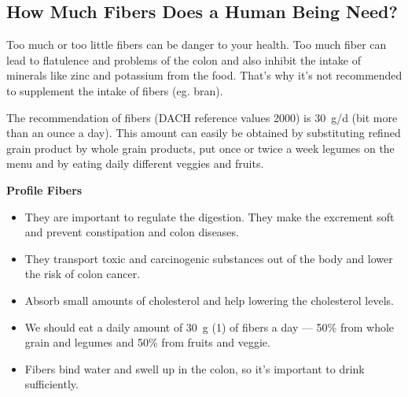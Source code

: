 \documentclass[../main.tex]{subfiles}
\begin{document}


  \subsection{How Much Fibers Does a Human Being Need?}

  Too much or too little fibers can be danger to your health.
  Too much fiber can lead to flatulence and problems of the colon
  and also inhibit the intake of minerals like zinc and potassium from the food.
  That's why it's not recommended to supplement the intake of fibers (eg. bran).

  The recommendation of fibers (DACH reference values 2000) is \SI{30}{\g/\day} (bit more than an ounce a day).
  This amount can easily be obtained by substituting refined grain product by whole grain products,
  put once or twice a week legumes on the menu and by eating daily different veggies and fruits.

  
\vspace{5mm}
\noindent
\begin{fminipage}{\textwidth}
  \textbf{Profile Fibers}
  \begin{itemize}
  \item They are important to regulate the digestion.
    They make the excrement soft and prevent constipation and colon diseases.
  \item They transport toxic and carcinogenic substances out of the body and lower the risk of colon cancer.
    \item Absorb small amounts of cholesterol and help lowering the cholesterol levels.
    \item We should eat a daily amount of \SI{30}{\g} (\SI{1}{\oz}) of fibers a day ---
      50\% from whole grain and legumes and 50\% from fruits and veggie.
      \item Fibers bind water and swell up in the colon, so it's important to drink sufficiently.
  \end{itemize}
\end{fminipage}

\end{document}
